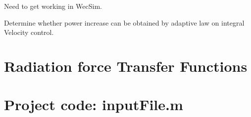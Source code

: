 \documentclass{report}
\begin{document}
Need to get working in WecSim.

Determine whether power increase can be obtained by adaptive law on integral Velocity control.






\appendix
\appendixpage
\addappheadtotoc
\chapter{Radiation force Transfer Functions}
\label{radiationTFs}

\chapter{Project code: inputFile.m}
\label{inputFile}
\end{document}
